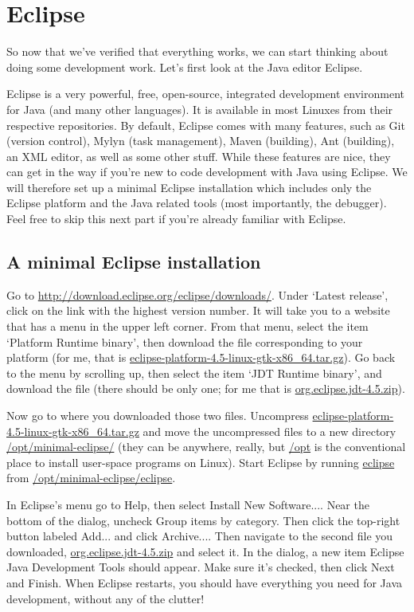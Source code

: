 \chapter{Eclipse}

So now that we've verified that everything works, we can start thinking about doing some development work. Let's first look at the Java editor Eclipse.

Eclipse is a very powerful, free, open-source, integrated development environment for Java (and many other languages). It is available in most Linuxes from their respective repositories. By default, Eclipse comes with many features, such as Git (version control), Mylyn (task management), Maven (building), Ant (building), an XML editor, as well as some other stuff. While these features are nice, they can get in the way if you're new to code development with Java using Eclipse. We will therefore set up a minimal Eclipse installation which includes only the Eclipse platform and the Java related tools (most importantly, the debugger). Feel free to skip this next part if you're already familiar with Eclipse.

\section{A minimal Eclipse installation}

Go to \url{http://download.eclipse.org/eclipse/downloads/}. Under `Latest release', click on the link with the highest version number. It will take you to a website that has a menu in the upper left corner. From that menu, select the item `Platform Runtime binary', then download the file corresponding to your platform (for me, that is \url{eclipse-platform-4.5-linux-gtk-x86_64.tar.gz}). Go back to the menu by scrolling up, then select the item `JDT Runtime binary', and download the file (there should be only one; for me that is \url{org.eclipse.jdt-4.5.zip}).

Now go to where you downloaded those two files. Uncompress \url{eclipse-platform-4.5-linux-gtk-x86_64.tar.gz} and move the uncompressed files to a new directory \mytilde\url{/opt/minimal-eclipse/} (they can be anywhere, really, but \mytilde\url{/opt} is the conventional place to install user-space programs on Linux). Start Eclipse by running \url{eclipse} from \mytilde\url{/opt/minimal-eclipse/eclipse}.

In Eclipse's menu go to \textsf{Help}, then select \textsf{Install New Software...}. Near the bottom of the dialog, uncheck \textsf{Group items by category}. Then click the top-right button labeled \textsf{Add...} and click \textsf{Archive...}. Then navigate to the second file you downloaded, \url{org.eclipse.jdt-4.5.zip} and select it. In the dialog, a new item \textsf{Eclipse Java Development Tools} should appear. Make sure it's checked, then click \textsf{Next} and \textsf{Finish}. When Eclipse restarts, you should have everything you need for Java development, without any of the clutter!

